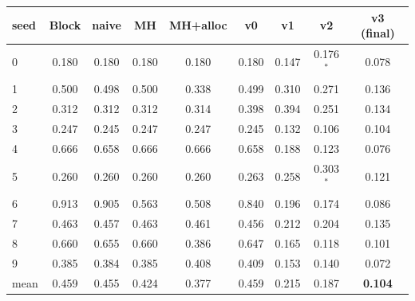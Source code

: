 \begin{tabular}{lcccccccc}
\toprule
seed & Block & naive & MH & MH+alloc & v0 & v1 & v2 & v3 (final) \\
\midrule
0 & 0.180 & 0.180 & 0.180 & 0.180 & 0.180 & 0.147 & 0.176$^{*}$ & 0.078 \\
1 & 0.500 & 0.498 & 0.500 & 0.338 & 0.499 & 0.310 & 0.271 & 0.136 \\
2 & 0.312 & 0.312 & 0.312 & 0.314 & 0.398 & 0.394 & 0.251 & 0.134 \\
3 & 0.247 & 0.245 & 0.247 & 0.247 & 0.245 & 0.132 & 0.106 & 0.104 \\
4 & 0.666 & 0.658 & 0.666 & 0.666 & 0.658 & 0.188 & 0.123 & 0.076 \\
5 & 0.260 & 0.260 & 0.260 & 0.260 & 0.263 & 0.258 & 0.303$^{*}$ & 0.121 \\
6 & 0.913 & 0.905 & 0.563 & 0.508 & 0.840 & 0.196 & 0.174 & 0.086 \\
7 & 0.463 & 0.457 & 0.463 & 0.461 & 0.456 & 0.212 & 0.204 & 0.135 \\
8 & 0.660 & 0.655 & 0.660 & 0.386 & 0.647 & 0.165 & 0.118 & 0.101 \\
9 & 0.385 & 0.384 & 0.385 & 0.408 & 0.409 & 0.153 & 0.140 & 0.072 \\
\midrule
mean & 0.459 & 0.455 & 0.424 & 0.377 & 0.459 & 0.215 & 0.187 & \textbf{0.104} \\
\bottomrule
\end{tabular}